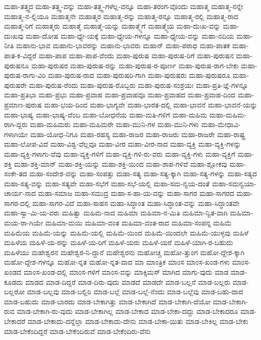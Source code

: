 {ಮಹಾ-ತತ್ತ್ವದ
ಮಹಾ-ತತ್ತ್ವ-ವನ್ನು
ಮಹಾ-ತತ್ತ್ವ-ಗಳೆಲ್ಲ-ವನ್ನೂ
ಮಹಾ-ತರಂಗ-ವೊಂದು
ಮಹಾತ್ಮ
ಮಹಾತ್ಮ-ನನ್ನೇ
ಮಹಾತ್ಮ-ನ-ಲ್ಲಿಯೂ
ಮಹಾತ್ಮನೇ
ಮಹಾತ್ಮರ
ಮಹಾತ್ಮ-ರನ್ನು
ಮಹಾತ್ಮ-ರನ್ನೂ
ಮಹಾತ್ಮ-ರಲ್ಲಿ
ಮಹಾತ್ಮ-ರಾದ
ಮಹಾತ್ಮ-ರಿಗೆ
ಮಹಾತ್ಮರು
ಮಹಾತ್ಮೆ
ಮಹಾತ್ಮೆ-ಯನ್ನು
ಮಹಾತ್ಮ್ಯೆಗೆ
ಮಹಾತ್ಮ್ಯೆಯ
ಮಹಾ-ದುಃಖ-ವನ್ನು
ಮಹಾ-ದುಃಖವು
ಮಹಾ-ದೋಷ
ಮಹಾ-ಧ್ಯೇ-ಯಕ್ಕೆ
ಮಹಾ-ಧ್ಯೇಯ-ಗಳನ್ನೂ
ಮಹಾ-ಧ್ಯೇಯ-ವನ್ನು
ಮಹಾ-ನದಿಯ
ಮಹಾ-ನೀತಿ
ಮಹಾನು-ಭಾವ
ಮಹಾನು-ಭಾವರನ್ನು
ಮಹಾನು-ಭಾವರು
ಮಹಾನ್
ಮಹಾ-ಪರಾಧ
ಮಹಾ-ಪಾತಕ
ಮಹಾ-ಪಾತ-ಕ-ವಿದ್ದರೆ
ಮಹಾ-ಪಾಪ
ಮಹಾ-ಪಾಪ-ವೆಂದು
ಮಹಾ-ಪುರುಷ
ಮಹಾ-ಪುರುಷ-ರಿಗೆ
ಮಹಾ-ಪುರುಷನ
ಮಹಾ-ಪುರುಷನೂ
ಮಹಾ-ಪುರುಷರ
ಮಹಾ-ಪುರುಷ-ರನ್ನು
ಮಹಾ-ಪುರುಷ-ರ-ಪೂರ್ಣ
ಮಹಾ-ಪುರುಷ-ರಾಗ-ಬೇಕು
ಮಹಾ-ಪುರುಷ-ರಾಗು-ವಿರಿ
ಮಹಾ-ಪುರುಷ-ರಾದ
ಮಹಾ-ಪುರುಷರಿ-ಗಾಗಿ
ಮಹಾ-ಪುರುಷರು
ಮಹಾ-ಪುರುಷರೂ
ಮಹಾ-ಪುರುಷರೇ
ಮಹಾ-ಪುರುಷ-ರೆಂದು
ಮಹಾ-ಪುರುಷ-ರೊಬ್ಬರು
ಮಹಾ-ಪುರುಷ-ಸಂಶ್ರಯಃ
ಮಹಾ-ಪ್ರತಿ-ಜ್ಞೆ-ಗಳನ್ನೂ
ಮಹಾ-ಪ್ರತಿಭಾ
ಮಹಾ-ಪ್ರಭು
ಮಹಾ-ಪ್ರವಾಹ
ಮಹಾ-ಪ್ರವಾಹವೂ
ಮಹಾ-ಪ್ರವಾಹದ
ಮಹಾ-ಪ್ರವಾಹ-ದಿಂದ
ಮಹಾ-ಪ್ರಮಾಣ-ಪುರುಷ
ಮಹಾ-ಭಯ-ದಿಂದ
ಮಹಾ-ಭಾಗ್ಯವೇ
ಮಹಾ-ಭಾರತ-ದಲ್ಲಿ
ಮಹಾ-ಭಾವನೆ
ಮಹಾ-ಭಾವನೆ-ಯನ್ನು
ಮಹಾ-ಭಾಷ್ಯ
ಮಹಾ-ಭಾಷ್ಯ-ವೆಂಬ
ಮಹಾ-ಬೋಧನೆಯ
ಮಹಾ-ಮತಿ-ಗಳಿಗೆ
ಮಹಾ-ಮಹಿಮ
ಮಹಾ-ಮಹಿಮ-ರಾಗಿ-ದ್ದರು
ಮಹಾ-ಮಹಿಮರು
ಮಹಾ-ಮಹಿಮರೇ
ಮಹಾ-ಮುನಿ-ಗಳ
ಮಹಾ-ಮುನಿ-ಗಳು
ಮಹಾ-ಮೇಧಾವಿ-ಗಳಾಗಿಯೇ
ಮಹಾ-ಯೋಧ-ನಿಗೂ
ಮಹಾ-ರಹಸ್ಯ
ಮಹಾ-ರಾಜರ
ಮಹಾ-ರಾಜರು
ಮಹಾ-ರಾಜರೇ
ಮಹಾ-ರಾಷ್ಟ್ರ
ಮಹಾ-ಲೋಪ-ವಿದೆ
ಮಹಾ-ವಿಶ್ವ-ವೆಲ್ಲವೂ
ಮಹಾ-ವೀರ
ಮಹಾ-ವೀರ-ನಾದ
ಮಹಾ-ವ್ಯಕ್ತಿ
ಮಹಾ-ವ್ಯಕ್ತಿ-ಗಳನ್ನು
ಮಹಾ-ವ್ಯಕ್ತಿ-ಗಳಾಗು-ವೆವು
ಮಹಾ-ವ್ಯಕ್ತಿ-ಗಳಿಗೆ
ಮಹಾ-ವ್ಯಕ್ತಿ-ಗಳಿ-ರು-ವರು
ಮಹಾ-ವ್ಯಕ್ತಿ-ಗಳು
ಮಹಾ-ವ್ಯಕ್ತಿಗೆ
ಮಹಾ-ಶಕ್ತಿ
ಮಹಾ-ಶಕ್ತಿ-ಮಾನ್
ಮಹಾ-ಶಕ್ತಿ-ಯನ್ನು
ಮಹಾ-ಶಕ್ತಿ-ಯಿಂದ
ಮಹಾ-ಶಾಪ-ಗಳಿವೆ
ಮಹಾ-ಶ್ಲೋಕವು
ಮಹಾ-ಸಂಕೇ-ತದ
ಮಹಾ-ಸಂದೇಶ-ವನ್ನು
ಮಹಾ-ಸಂಪತ್ತು
ಮಹಾ-ಸತ್ಯ
ಮಹಾ-ಸತ್ಯ-ಕ್ಕಾಗಿ
ಮಹಾ-ಸತ್ಯ-ಗಳನ್ನು
ಮಹಾ-ಸತ್ಯದ
ಮಹಾ-ಸತ್ಯ-ವನ್ನು
ಮಹಾ-ಸತ್ಯವೇ
ಮಹಾ-ಸಭೆಗೆ
ಮಹಾ-ಸಭೆ-ಯಲ್ಲಿ
ಮಹಾ-ಸಮ-ನ್ವಯ-ದಂತೆ
ಮಹಾ-ಸಮನ್ವಯಾ-ಚಾರ್ಯ-ನಾದ
ಮಹಾ-ಸಮಾಜ
ಮಹಾ-ಸಮುದ್ರ
ಮಹಾ-ಸ-ಹಾ-ಯ-ವನ್ನು
ಮಹಾ-ಸಾಗರ
ಮಹಾ-ಸಾಗರದ
ಮಹಾ-ಸಾಗರ-ದಲ್ಲಿ
ಮಹಾ-ಸಾಗರ-ವಿದೆ
ಮಹಾ-ಸಾಹಸ
ಮಹಾ-ಸಿದ್ಧಾಂತ
ಮಹಾ-ಸಿದ್ಧಾಂತ-ವನ್ನು
ಮಹಾ-ಸಿದ್ಧಾಂತವೇ
ಮಹಾ-ಸ್ವಾ-ಮಿ-ಯ-ವರು
ಮಹಿತ್ವಾ
ಮಹಿಮ-ನಾದ
ಮಹಿಮಾ
ಮಹಿಮಾ-ನ-ಮಿತಿ
ಮಹಿಮಾ-ನ್ವಿತ-ವಾಗಿ
ಮಹಿಮಾ-ಮಯ-ರಾ-ಗಿಯೇ
ಮಹಿಮಾ-ಮಯಿ
ಮಹಿಮಾ-ವಂತ
ಮಹಿಮಾ-ವಂತ-ರಾದ
ಮಹಿಮಾ-ಸಂಪನ್ನ
ಮಹಿಮೆ
ಮಹಿಮೆಯ
ಮಹಿಮೆ-ಯನ್ನು
ಮಹಿಮೆ-ಯಲ್ಲಿ
ಮಹಿಮೆ-ಯಿಂದ
ಮಹಿಮೆ-ಯಿಂದಲೇ
ಮಹಿಮೆ-ಯುಳ್ಳವು
ಮಹಿಳೆ
ಮಹಿಳೆಯ
ಮಹಿಳೆ-ಯ-ರನ್ನು
ಮಹಿಳೆ-ಯ-ರಿಗೆ
ಮಹಿಳೆ-ಯರು
ಮಹಿಳೆ-ಯರೆ
ಮಹಿಳೆ-ಯಾಗಿ-ರ-ಬಹುದು
ಮಹಿಳೆಯು
ಮಹೇಶ್ವರನ
ಮಹೇಶ್ವರ-ನಿ-ದ್ದಾನೆ
ಮಹೇಶ್ವರನು
ಮಹೋಚ್ಚ
ಮಹೋ-ತ್ತುಂಗ
ಮಹೋ-ದ್ದೇಶ-ಕ್ಕಾಗಿ
ಮಹೋ-ದ್ದೇಶ-ಗಳನ್ನೂ
ಮಹೋ-ನ್ನತ
ಮಹೋ-ನ್ನತ-ವಾದ
ಮಾ
ಮಾಂತ್ರಿಕ
ಮಾಂಸ
ಮಾಂಸ-ಖಂಡ-ಗಳು
ಮಾಂಸ-ಖಂಡದ
ಮಾಂಸ-ಖಂಡ-ದಲ್ಲಿ
ಮಾಂಸ-ಗಳಿಗೆ
ಮಾಂಸ-ವನ್ನು
ಮಾಕ್ಸಿಮಸ್
ಮಾಗಿದ
ಮಾಗು-ವುದು
ಮಾಡ
ಮಾಡ-ಕೂಡದು
ಮಾಡದ
ಮಾಡ-ದಿದ್ದರೆ
ಮಾಡ-ದಿರು-ವುದು
ಮಾಡದೆ
ಮಾಡದೇ
ಮಾಡ-ಬಲ್ಲನೆ
ಮಾಡ-ಬಲ್ಲರು
ಮಾಡ-ಬಲ್ಲರೋ
ಮಾಡ-ಬಲ್ಲವು
ಮಾಡ-ಬಲ್ಲಿರಿ
ಮಾಡ-ಬಲ್ಲೆ
ಮಾಡ-ಬಲ್ಲೆ-ನೆಂದು
ಮಾಡ-ಬಲ್ಲೆವು
ಮಾಡ-ಬಹು-ದಾದ
ಮಾಡ-ಬಹುದು
ಮಾಡ-ಬಾರದು
ಮಾಡ-ಬೇಕಾಗಿತ್ತು
ಮಾಡ-ಬೇಕಾಗಿದೆ
ಮಾಡ-ಬೇಕಾಗಿ-ದೆಯೋ
ಮಾಡ-ಬೇಕಾಗಿ-ರುವ
ಮಾಡ-ಬೇಕಾಗಿ-ರು-ವುದು
ಮಾಡ-ಬೇಕಾಗಿಲ್ಲ
ಮಾಡ-ಬೇಕಾದ
ಮಾಡ-ಬೇಕಾ-ದದ್ದು
ಮಾಡ-ಬೇಕಾದರೂ
ಮಾಡ-ಬೇಕಾದರೆ
ಮಾಡ-ಬೇಕಾದು-ದನ್ನೆಲ್ಲಾ
ಮಾಡ-ಬೇಕಾದು-ದೇನು
ಮಾಡ-ಬೇಕಾ-ಯಿತು
ಮಾಡ-ಬೇಕಿಲ್ಲ
ಮಾಡ-ಬೇಕು
ಮಾಡ-ಬೇಕೆಂದಿದ್ದರೆ
ಮಾಡ-ಬೇಕೆಂದಿರುವೆ
ಮಾಡ-ಬೇಕೆಂದಿರು-ವೆನು
}
